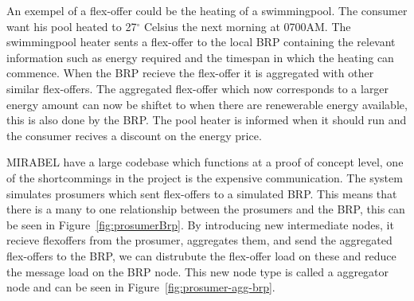 \documentclass{ifacconf}
\begin{document}
An exempel of a flex-offer could be the heating of a swimmingpool. 
The consumer want his pool heated to 27$^\circ$ Celsius the next morning at 0700AM.
The swimmingpool heater sents a flex-offer to the local BRP containing the relevant information such as energy required and the timespan in which the heating can commence.
When the BRP recieve the flex-offer it is aggregated with other similar flex-offers. 
The aggregated flex-offer which now corresponds to a larger energy amount can now be shiftet to when there are renewerable energy available, this is also done by the BRP.  
The pool heater is informed when it should run and the consumer recives a discount on the energy price. 


MIRABEL have a large codebase which functions at a proof of concept level, one of the shortcommings in the project is the expensive communication.
The system simulates prosumers which sent flex-offers to a simulated BRP. 
This means that there is a many to one relationship between the prosumers and the BRP, this can be seen in Figure~\ref{fig:prosumerBrp}.
By introducing new intermediate nodes, it recieve flexoffers from the prosumer, aggregates them, and send the aggregated flex-offers to the BRP, we can distrubute the flex-offer load on these and reduce the message load on the BRP node. 
This new node type is called a aggregator node and can be seen in Figure~\ref{fig:prosumer-agg-brp}.
\end{document}
